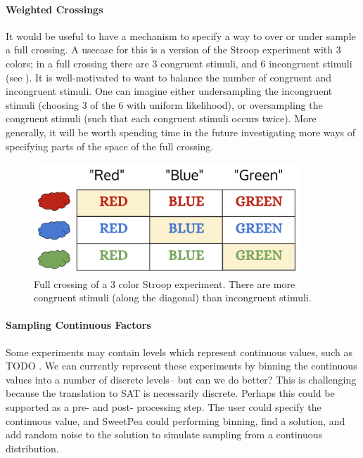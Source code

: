 \paragraph*{Weighted Crossings}
It would be useful to have a mechanism to specify a way to over or under sample a full crossing. A usecase for this is a version of the Stroop experiment with 3 colors; in a full crossing there are 3 congruent stimuli, and 6 incongruent stimuli (see ). It is well-motivated to want to balance the number of congruent and incongruent stimuli. One can imagine either undersampling the incongruent stimuli (choosing 3 of the 6 with uniform likelihood), or oversampling the congruent stimuli (such that each congruent stimuli occurs twice). More generally, it will be worth spending time in the future investigating more ways of specifying parts of the space of the full crossing.

\begin{figure}[t]
    \centerline{\includegraphics[origin=c,width=10cm]{fig_weighted_crossing}}
    \caption{Full crossing of a 3 color Stroop experiment. There are more congruent stimuli (along the diagonal) than incongruent stimuli.}%
    \label{fig:weighted_crossing}%
\end{figure}

\paragraph*{Sampling Continuous Factors}
Some experiments may contain levels which represent continuous values, such as TODO . We can currently represent these experiments by binning the continuous values into a number of discrete levels-- but can we do better? This is challenging because the translation to SAT is necessarily discrete. Perhaps this could be supported as a pre- and post- processing step. The user could specify the continuous value, and SweetPea could performing binning, find a solution, and add random noise to the solution to simulate sampling from a continuous distribution.

